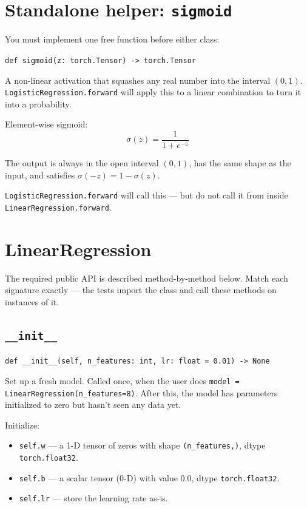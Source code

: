 \documentclass[11pt]{article}
\newcommand{\code}[1]{\texttt{\small #1}}
\begin{document}
\section{Standalone helper: \texttt{sigmoid}}

You must implement one free function before either class:

\medskip\noindent
\code{def sigmoid(z: torch.Tensor) -> torch.Tensor}

\medskip\noindent
A non-linear activation that squashes any real number into the
interval $(0, 1)$. \code{LogisticRegression.forward} will apply this to a
linear combination to turn it into a probability.

\medskip\noindent
Element-wise sigmoid:
\[
    \sigma(z) = \frac{1}{1 + e^{-z}}
\]

\noindent
The output is always in the open interval $(0, 1)$, has the same shape as the
input, and satisfies $\sigma(-z) = 1 - \sigma(z)$.

\medskip
\noindent
\code{LogisticRegression.forward} will call this --- but do not call it from
inside \code{LinearRegression.forward}.

\section{LinearRegression}

The required public API is described method-by-method below. Match each
signature exactly --- the tests import the class and call these methods on
instances of it.

\subsection{\texttt{\_\_init\_\_}}

\noindent
\code{def \_\_init\_\_(self, n\_features: int, lr: float = 0.01) -> None}

\medskip\noindent
Set up a fresh model. Called once, when the user does
\code{model = LinearRegression(n\_features=8)}. After this, the model has
parameters initialized to zero but hasn't seen any data yet.

\medskip\noindent
Initialize:
\begin{itemize}
    \item \code{self.w} --- a 1-D tensor of zeros with shape \code{(n\_features,)},
          dtype \code{torch.float32}.
    \item \code{self.b} --- a scalar tensor (0-D) with value $0.0$, dtype
          \code{torch.float32}.
    \item \code{self.lr} --- store the learning rate as-is.
\end{itemize}
\end{document}
